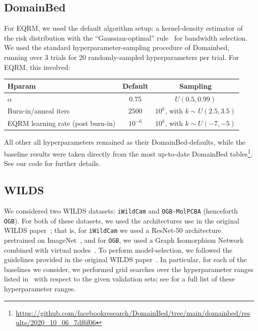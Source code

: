 \documentclass{article}
\begin{document}
%

%
%
%
%
%
%
%
%

\subsection{DomainBed}
\label{sec:impl_details:domainbed}%

For EQRM, we used the default algorithm setup: a kernel-density estimator of the risk distribution with the ``Gaussian-optimal'' rule~\citep{silverman1986density} for bandwidth selection. We used the standard hyperparameter-sampling procedure of Domainbed, running over 3 trials for 20 randomly-sampled hyperparameters per trial. For EQRM, this involved:

\begin{center}
\begin{tabular}{@{}lcc@{}}
\toprule
\textbf{Hparam}         & \textbf{Default}             & \textbf{Sampling} \\
\midrule
$\alpha$                & 0.75          & $U(0.5, 0.99)$ \\
Burn-in/anneal iters    & 2500          & $10^k$, with $k \sim U(2.5, 3.5)$ \\
EQRM learning rate (post burn-in)  & $10^{-6}$     & $10^k$, with $k \sim U(-7, -5)$ \\               
\bottomrule
\end{tabular}
\end{center}

%
%
%
%


All other all hyperparameters remained as their DomainBed-defaults, while the baseline results were taken directly from the most up-to-date DomainBed tables\footnote{\url{https://github.com/facebookresearch/DomainBed/tree/main/domainbed/results/2020_10_06_7df6f06}}. See our code for further details.

\subsection{WILDS}
\label{sec:impl_details:wilds}%

We considered two WILDS datasets: \texttt{iWildCam} and \texttt{OGB-MolPCBA} (henceforth \texttt{OGB}).  For both of these datasets, we used the architectures use in the original WILDS paper~\cite{wilds2021}; that is, for \texttt{iWildCam} we used a ResNet-50 architecture~\citep{he2016deep} 
pretrained on ImageNet~\citep{deng2009imagenet},
and for \texttt{OGB}, we used a Graph Isomorphism Network~\citep{xu2018powerful}
combined with virtual nodes~\cite{gilmer2017neural}. 
To perform model-selection, we followed the guidelines provided in the original WILDS paper~\cite{wilds2021}.  In particular, for each of the baselines we consider, we performed grid searches over the hyperparameter ranges listed in~\cite{wilds2021} with respect to the given validation sets; see \cite[Appendices E.1.2 and E.4.2]{wilds2021} for a full list of these hyperparameter ranges.
\end{document}
